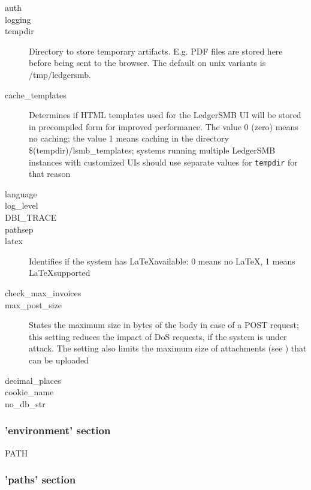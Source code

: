 \begin{description}
\item[auth]
\item[logging]
\item[tempdir] Directory to store temporary artifacts. E.g. PDF files are stored here before
    being sent to the browser. The default on unix variants is /tmp/ledgersmb.
\item[cache\_templates] Determines if HTML templates used for the LedgerSMB UI will be stored
    in precompiled form for improved performance. The value 0 (zero) means no caching; the value
    1 means caching in the directory \$(tempdir)/lsmb\_templates; systems running multiple
    LedgerSMB instances with customized UIs should use separate values for {\tt tempdir} for that
    reason
\item[language]
\item[log\_level]
\item[DBI\_TRACE]
\item[pathsep]
\item[latex] Identifies if the system has \LaTeX available: 0 means no \LaTeX, 1 means \LaTeX supported
\item[check\_max\_invoices]
\item[max\_post\_size] States the maximum size in bytes of the body in case of a POST request; this
    setting reduces the impact of DoS requests, if the system is under attack. The setting also limits the
    maximum size of attachments (see ) that can be uploaded
\item[decimal\_places]
\item[cookie\_name]
\item[no\_db\_str]

\end{description}

\subsubsection{'environment' section}
\label{subsubsec-global-config-ledgersmb-conf-environment}

\begin{description}
\item[PATH]
\end{description}


\subsubsection{'paths' section}
\label{subsubsec-global-config-ledgersmb-conf-paths}

